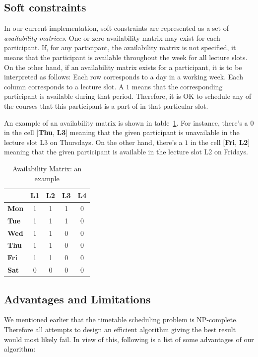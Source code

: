 \documentclass[11pt,a4paper]{article}
\begin{document}
\subsection{Soft constraints}
In our current implementation, soft constraints are represented as a set of \emph{availability matrices}. One or zero availability matrix may exist for each participant. If, for any participant, the availability matrix is not specified, it means that the participant is available throughout the week for all lecture slots. On the other hand, if an availability matrix exists for a participant, it is to be interpreted as follows: Each row corresponds to a day in a working week. Each column corresponds to a lecture slot. A $1$ means that the corresponding participant is available during that period. Therefore, it is OK to schedule any of the courses that this participant is a part of in that particular slot.

An example of an availability matrix is shown in table~\ref{t:am}. For instance, there's a $0$ in the cell [\textbf{Thu}, \textbf{L3}] meaning that the given participant is unavailable in the lecture slot L3 on Thursdays. On the other hand, there's a $1$ in the cell [\textbf{Fri}, \textbf{L2}] meaning that the given participant is available in the lecture slot L2 on Fridays.
  
\begin{table}
\begin{center}

\begin{tabular}{l | c | c | c | c}
    & \textbf{L1} & \textbf{L2} & \textbf{L3} & \textbf{L4} \\
\hline
\textbf{Mon} & 1  & 1  & 1  & 0 \\
\textbf{Tue} & 1  & 1  & 1  & 0 \\
\textbf{Wed} & 1  & 1  & 0  & 0 \\
\textbf{Thu} & 1  & 1  & 0  & 0 \\
\textbf{Fri} & 1  & 1  & 0  & 0 \\
\textbf{Sat} & 0  & 0  & 0  & 0

\end{tabular}
\end{center}
\caption{Availability Matrix: an example}
\label{t:am}
\end{table}

\subsection{Advantages and Limitations}
We mentioned earlier that the timetable scheduling problem is NP-complete. Therefore all attempts to design an efficient algorithm giving the best result would most likely fail. In view of this, following is a list of some advantages of our algorithm:
\end{document}
